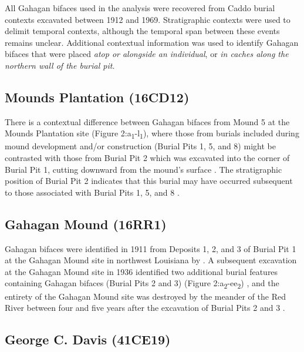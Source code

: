 \documentclass[]{interact}
\theoremstyle{plain}%
\theoremstyle{definition}
\theoremstyle{remark}
\begin{document}
All Gahagan bifaces used in the analysis were recovered from Caddo
burial contexts excavated between 1912 and 1969. Stratigraphic contexts
were used to delimit temporal contexts, although the temporal span
between these events remains unclear. Additional contextual information
was used to identify Gahagan bifaces that were placed \emph{atop or
alongside an individual}, or \emph{in caches along the northern wall of
the burial pit}.

\hypertarget{mounds-plantation-16cd12}{%
\subsection{Mounds Plantation (16CD12)}\label{mounds-plantation-16cd12}}

There is a contextual difference between Gahagan bifaces from Mound 5 at
the Mounds Plantation site (Figure
2:a\textsubscript{1}-l\textsubscript{1}), where those from burials
included during mound development and/or construction (Burial Pits 1, 5,
and 8) might be contrasted with those from Burial Pit 2 which was
excavated into the corner of Burial Pit 1, cutting downward from the
mound's surface \citep{RN8174}. The stratigraphic position of Burial Pit
2 indicates that this burial may have occurred subsequent to those
associated with Burial Pits 1, 5, and 8 \citep{RN8174}.

\hypertarget{gahagan-mound-16rr1}{%
\subsection{Gahagan Mound (16RR1)}\label{gahagan-mound-16rr1}}

Gahagan bifaces were identified in 1911 from Deposits 1, 2, and 3 of
Burial Pit 1 at the Gahagan Mound site in northwest Louisiana by
\citet[Figures 18-19, 21]{RN7115}. A subsequent excavation at the
Gahagan Mound site in 1936 identified two additional burial features
containing Gahagan bifaces (Burial Pits 2 and 3) (Figure
2:a\textsubscript{2}-ee\textsubscript{2}) \citep[Plate 27]{RN8176}, and
the entirety of the Gahagan Mound site was destroyed by the meander of
the Red River between four and five years after the excavation of Burial
Pits 2 and 3 \citep{RN10759}.

\hypertarget{george-c.-davis-41ce19}{%
\subsection{George C. Davis (41CE19)}\label{george-c.-davis-41ce19}}
\end{document}

